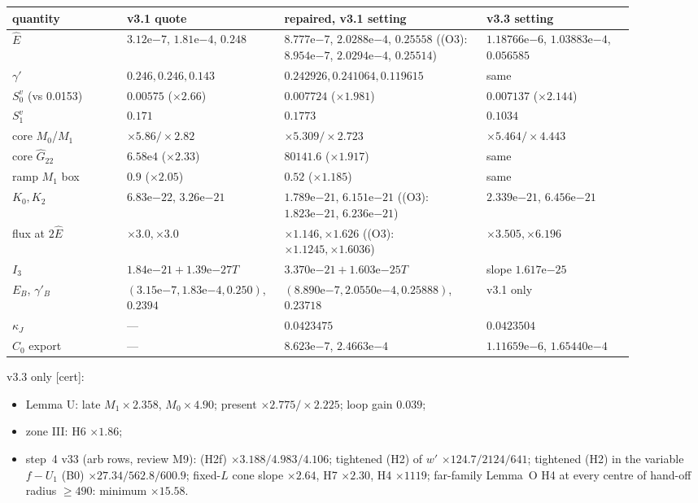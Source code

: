 \documentclass[10pt]{article}
\newcommand{\cert}{\textup{[cert]}}
\newcommand{\Ghat}{\hat G}
\begin{document}
{\scriptsize
\begin{longtable}{p{0.17\linewidth}p{0.2\linewidth}p{0.3\linewidth}p{0.22\linewidth}}\toprule
quantity & v3.1 quote & repaired, v3.1 setting & v3.3 setting\\\midrule\endhead
$\hat E$ & $3.12\mathrm{e}{-7}$, $1.81\mathrm{e}{-4}$, $0.248$ & $8.777\mathrm{e}{-7}$, $2.0288\mathrm{e}{-4}$, $0.25558$ ((O3): $8.954\mathrm{e}{-7}$, $2.0294\mathrm{e}{-4}$, $0.25514$) & $1.18766\mathrm{e}{-6}$, $1.03883\mathrm{e}{-4}$, $0.056585$\\
$\gamma'$ & $0.246,0.246,0.143$ & $0.242926,0.241064,0.119615$ & same\\
$S_0^v$ (vs 0.0153) & $0.00575$ ($\times2.66$) & $0.007724$ ($\times1.981$) & $0.007137$ ($\times2.144$)\\
$S_1^v$ & $0.171$ & $0.1773$ & $0.1034$\\
core $M_0$/$M_1$ & $\times5.86/\times2.82$ & $\times5.309/\times2.723$ & $\times5.464/\times4.443$\\
core $\Ghat_{22}$ & $6.58\mathrm{e}4$ ($\times2.33$) & $80141.6$ ($\times1.917$) & same\\
ramp $M_1$ box & $0.9$ ($\times2.05$) & $0.52$ ($\times1.185$) & same\\
$K_0,K_2$ & $6.83\mathrm{e}{-22}$, $3.26\mathrm{e}{-21}$ & $1.789\mathrm{e}{-21}$, $6.151\mathrm{e}{-21}$ ((O3): $1.823\mathrm{e}{-21}$, $6.236\mathrm{e}{-21}$) & $2.339\mathrm{e}{-21}$, $6.456\mathrm{e}{-21}$\\
flux at $2\hat E$ & $\times3.0,\times3.0$ & $\times1.146,\times1.626$ ((O3): $\times1.1245,\times1.6036$) & $\times3.505,\times6.196$\\
$I_3$ & $1.84\mathrm{e}{-21}+1.39\mathrm{e}{-27}T$ & $3.370\mathrm{e}{-21}+1.603\mathrm{e}{-25}T$ & slope $1.617\mathrm{e}{-25}$\\
$E_B$, $\gamma'_B$ & $(3.15\mathrm{e}{-7},1.83\mathrm{e}{-4},0.250)$, $0.2394$ & $(8.890\mathrm{e}{-7},2.0550\mathrm{e}{-4},0.25888)$, $0.23718$ & v3.1 only\\
$\kappa_J$ & --- & $0.0423475$ & $0.0423504$\\
$C_0$ export & --- & $8.623\mathrm{e}{-7}$, $2.4663\mathrm{e}{-4}$ & $1.11659\mathrm{e}{-6}$, $1.65440\mathrm{e}{-4}$\\\bottomrule
\end{longtable}}
v3.3 only \cert:
\begin{itemize}
\item Lemma U: late $M_1\times2.358$, $M_0\times4.90$; present $\times2.775/\times2.225$; loop gain $0.039$;
\item zone III: H6 $\times1.86$;
\item step~4 v33 (arb rows, review M9): (H2f) $\times3.188/4.983/4.106$; tightened (H2) of $w'$ $\times124.7/2124/641$; tightened (H2) in the variable $f-U_1$ (B0) $\times27.34/562.8/600.9$; fixed-$L$ cone slope $\times2.64$, H7 $\times2.30$, H4 $\times1119$; far-family Lemma~O H4 at every centre of hand-off radius $\ge490$: minimum $\times15.58$.
\end{itemize}
\end{document}
